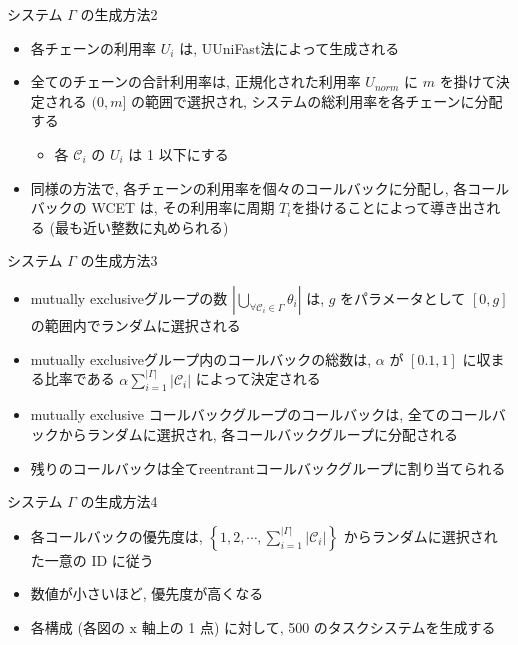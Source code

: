 \begin{frame}{システム $\Gamma$ の生成方法2}
    \begin{itemize}
        \item 各チェーンの利用率 $U_{i}$ は, UUniFast法\cite{emberson2010techniques}によって生成される
        \item 全てのチェーンの合計利用率は, 正規化された利用率 $U_{n o r m}$ に $m$ を掛けて決定される $(0, m]$ の範囲で選択され, システムの総利用率を各チェーンに分配する
              \begin{itemize}
                  \item 各 $\mathcal{C}_{i}$ の $U_{i}$ は 1 以下にする
              \end{itemize}
        \item 同様の方法で, 各チェーンの利用率を個々のコールバックに分配し, 各コールバックの WCET は, その利用率に周期 $T_{i}$を掛けることによって導き出される (最も近い整数に丸められる)
    \end{itemize}
\end{frame}

\begin{frame}{システム $\Gamma$ の生成方法3}
    \begin{itemize}
        \item mutually exclusiveグループの数 $\left|\bigcup_{\forall \mathcal{C}_{i} \in \Gamma} \theta_{i}\right|$ は, $g$ をパラメータとして $[0, g]$ の範囲内でランダムに選択される
        \item mutually exclusiveグループ内のコールバックの総数は, $\alpha$ が $[0.1,1]$ に収まる比率である $\alpha \sum_{i=1}^{|\Gamma|}\left|\mathcal{C}_{i}\right|$ によって決定される
        \item mutually exclusive コールバックグループのコールバックは, 全てのコールバックからランダムに選択され, 各コールバックグループに分配される
        \item 残りのコールバックは全てreentrantコールバックグループに割り当てられる
    \end{itemize}
\end{frame}

\begin{frame}{システム $\Gamma$ の生成方法4}
    \begin{itemize}
        \item 各コールバックの優先度は, $\left\{1,2, \cdots, \sum_{i=1}^{|\Gamma|}\left|\mathcal{C}_{i}\right|\right\}$ からランダムに選択された一意の ID に従う
        \item 数値が小さいほど, 優先度が高くなる
        \item 各構成 (各図の $\mathrm{x}$ 軸上の 1 点) に対して, 500 のタスクシステムを生成する
    \end{itemize}
\end{frame}

